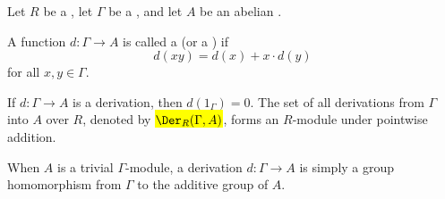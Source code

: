 \begin{definition} \label{definition:derivation_from_a_group_to_a_group_module_of_it_over_a_ring}
    Let $R$ be a , let $\Gamma$ be a , and let $A$ be an abelian .

    A function $d: \Gamma \to A$ is called a  (or a ) if
    $$d(xy) = d(x) + x \cdot d(y)$$
    for all $x,y \in \Gamma$.

    If $d: \Gamma \to A$ is a derivation, then $d(1_\Gamma) = 0$. The set of all derivations from $\Gamma$ into $A$ over $R$, denoted by \hl{$\Der_R(\Gamma, A)$}, forms an $R$-module under pointwise addition.

    When $A$ is a trivial $\Gamma$-module, a derivation $d: \Gamma \to A$ is simply a group homomorphism from $\Gamma$ to the additive group of $A$.
\end{definition}
